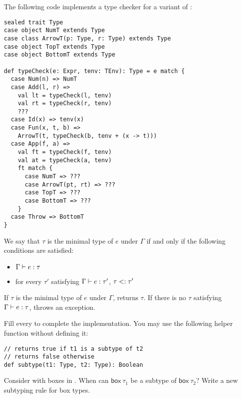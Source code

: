 \begin{exercise}

The following code implements a type checker for a variant of \lang:

\begin{verbatim}
sealed trait Type
case object NumT extends Type
case class ArrowT(p: Type, r: Type) extends Type
case object TopT extends Type
case object BottomT extends Type

def typeCheck(e: Expr, tenv: TEnv): Type = e match {
  case Num(n) => NumT
  case Add(l, r) =>
    val lt = typeCheck(l, tenv)
    val rt = typeCheck(r, tenv)
    ???
  case Id(x) => tenv(x)
  case Fun(x, t, b) =>
    ArrowT(t, typeCheck(b, tenv + (x -> t)))
  case App(f, a) =>
    val ft = typeCheck(f, tenv)
    val at = typeCheck(a, tenv)
    ft match {
      case NumT => ???
      case ArrowT(pt, rt) => ???
      case TopT => ???
      case BottomT => ???
    }
  case Throw => BottomT
}
\end{verbatim}

We say that $\tau$ is the minimal type of $e$ under $\Gamma$ if and only if
the following conditions are satisfied:

\begin{itemize}
  \item $\Gamma\vdash e:\tau$
  \item for every $\tau'$ satisfying $\Gamma\vdash e:\tau'$, $\tau<:\tau'$
\end{itemize}

If $\tau$ is the minimal type of $e$ under $\Gamma$,  returns $\tau$. If there is no $\tau$ satisfying $\Gamma\vdash e:\tau$,
 throws an exception.

Fill every  to complete the implementation. You may use the
following helper function without defining it:

\begin{verbatim}
// returns true if t1 is a subtype of t2
// returns false otherwise
def subtype(t1: Type, t2: Type): Boolean
\end{verbatim}

\end{exercise}

\begin{exercise}

Consider \plang with boxes in .
  When can $\textsf{box}\ \tau_1$ be a subtype of $\textsf{box}\ \tau_2$?
  Write a new subtyping rule for box types.

\end{exercise}


